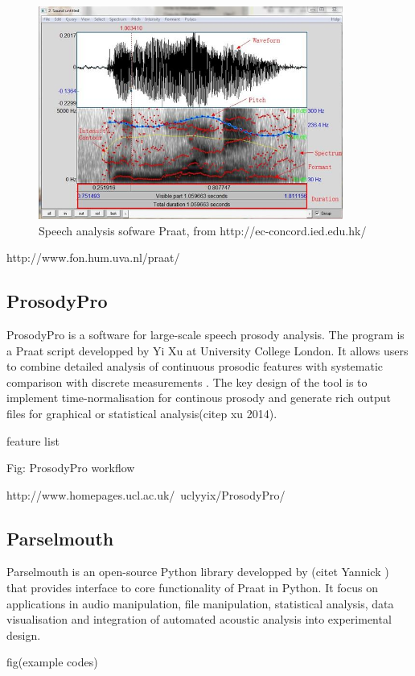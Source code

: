 \begin{figure}[ht]
	\center
	\includegraphics[width=10cm, scale=0.7]{figures/Praat.jpg}
	\caption{Speech analysis sofware Praat, from http://ec-concord.ied.edu.hk/}
	\label{fig:praat}
\end{figure}

http://www.fon.hum.uva.nl/praat/

\subsection{ProsodyPro}
ProsodyPro is a software for large-scale speech prosody analysis. The program is a Praat script developped by Yi Xu at University College London. It allows users to combine detailed analysis of continuous prosodic features with systematic comparison with discrete measurements . The key design of the tool is to implement time-normalisation for continous prosody and generate rich output files for graphical or statistical analysis(citep xu 2014).

feature list

Fig: ProsodyPro workflow

http://www.homepages.ucl.ac.uk/~uclyyix/ProsodyPro/

\subsection{Parselmouth}
Parselmouth is an open-source Python library developped by (citet Yannick ) that provides interface to core functionality of Praat in Python. It focus on applications in audio manipulation, file manipulation, statistical analysis, data visualisation and integration of automated acoustic analysis into experimental design.

fig(example codes)


